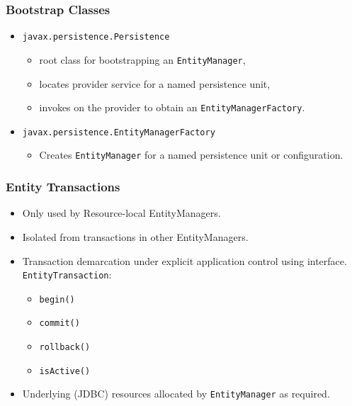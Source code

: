 \documentclass[10pt,xcolor=pdflatex]{beamer}
\begin{document}
\begin{frame}\frametitle{Bootstrap Classes}
	\begin{itemize}
		\item \texttt{javax.persistence.Persistence}
          \begin{itemize}
            \item root class for bootstrapping an \texttt{EntityManager},
		    \item locates provider service for a named persistence unit,
		    \item invokes on the provider to obtain an \texttt{EntityManagerFactory}.
          \end{itemize}
		\item \texttt{javax.persistence.EntityManagerFactory}
          \begin{itemize}
            \item Creates \texttt{EntityManager} for a named persistence unit or configuration.
          \end{itemize}
	\end{itemize}
\end{frame}


\begin{frame}\frametitle{Entity Transactions}
	\begin{itemize}
		\item Only used by Resource-local EntityManagers.
		\item Isolated from transactions in other EntityManagers.
		\item Transaction demarcation under explicit application control using interface. \texttt{EntityTransaction}:
        \begin{itemize}
        	\item \texttt{begin()}
            \item \texttt{commit()}
            \item \texttt{rollback()}
            \item \texttt{isActive()}
        \end{itemize}
		\item Underlying (JDBC) resources allocated by \texttt{EntityManager} as required.
	\end{itemize}
\end{frame}
\end{document}
